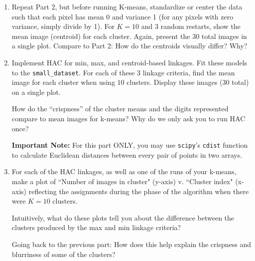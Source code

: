 \documentclass[submit]{harvardml}
\begin{document}
\begin{problem}
\begin{enumerate}
\item Repeat Part 2, but before running K-means, standardize or center
  the data such that each pixel has mean 0 and variance 1 (for any
  pixels with zero variance, simply divide by 1). For $K=10$ and 3
  random restarts, show the mean image (centroid) for each
  cluster. Again, present the 30 total images in a single
  plot. Compare to Part 2: How do the centroids visually differ? Why?

\item Implement HAC for min, max, and centroid-based linkages. Fit
  these models to the \texttt{small\_dataset}.  For each of these 3
  linkage criteria, find the mean image for each cluster when using
  $10$ clusters. Display these images (30 total) on a single plot.

  How do the ``crispness'' of the cluster means and the digits
  represented compare to mean images for k-means?  
  Why do we only ask you to run HAC once?  

  \textbf{Important Note:} For this part ONLY, you may use
  \texttt{scipy}'s \texttt{cdist} function to calculate Euclidean
  distances between every pair of points in two arrays.

\item For each of the HAC linkages, as well as one of the runs of your
  k-means, make a plot of ``Number of images in cluster" (y-axis)
  v. ``Cluster index" (x-axis) reflecting the assignments during the
  phase of the algorithm when there were $K=10$ clusters.

  Intuitively, what do these plots tell you about the difference
  between the clusters produced by the max and min linkage criteria?

  Going back to the previous part: How does this help explain the
  crispness and blurriness of some of the clusters?  
\end{enumerate}
\end{problem}
\end{document}
